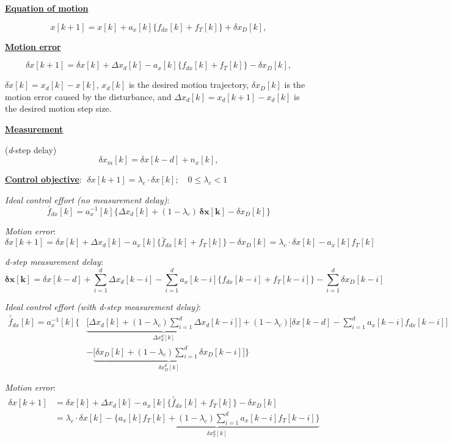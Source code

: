 \documentclass[11pt,a4paper]{ctexart}
\newcommand{\lc}{\lambda_c}
\newcommand{\hd}[1]{\par\medskip\noindent\underline{\textbf{#1}}\par\nobreak\vspace{0.2ex}}
\begin{document}
\hd{Equation of motion}
\[ x[k+1] = x[k] + a_x[k]\{f_{dx}[k] + f_T[k]\} + \delta x_D[k], \]

\hd{Motion error}
\[ \delta x[k+1] = \delta x[k] + \Delta x_d[k] - a_x[k]\{f_{dx}[k] + f_T[k]\} - \delta x_D[k], \]

$\delta x[k] = x_d[k] - x[k]$, $x_d[k]$ is the desired motion trajectory, $\delta x_D[k]$ is the motion error caused by the disturbance, and $\Delta x_d[k] = x_d[k+1] - x_d[k]$ is the desired motion step size.

\hd{Measurement} (\textit{d}-step delay)
\[ \delta x_m[k] = \delta x[k-d] + n_x[k], \]

\noindent\underline{\textbf{Control objective}}: $\;\delta x[k+1] = \lc \cdot \delta x[k];\quad 0 \le \lc < 1$

\medskip
\textit{Ideal control effort (no measurement delay)}:
\[ \bar f_{dx}[k] = a_x^{-1}[k]\{\Delta x_d[k] + (1-\lc)\,\bm{\delta x[k]} - \delta x_D[k]\} \]

\textit{Motion error}:
\[ \delta x[k+1] = \delta x[k] + \Delta x_d[k] - a_x[k]\{\bar f_{dx}[k] + f_T[k]\} - \delta x_D[k] = \lc \cdot \delta x[k] - a_x[k] f_T[k] \]

\textit{d-step measurement delay}:
\[ \bm{\delta x[k]} = \delta x[k-d] + \sum_{i=1}^{d}\Delta x_d[k-i] - \sum_{i=1}^{d} a_x[k-i]\{f_{dx}[k-i] + f_T[k-i]\} - \sum_{i=1}^{d}\delta x_D[k-i] \]

\textit{Ideal control effort (with d-step measurement delay)}:
\[
\begin{aligned}
\bar{\bar f}_{dx}[k] = a_x^{-1}[k]\bigg\{
& \underbrace{\Big[\Delta x_d[k] + (1-\lc)\textstyle\sum_{i=1}^{d}\Delta x_d[k-i]\Big]}_{\Delta x_d^{d}[k]}
+ (1-\lc)\Big[\delta x[k-d] - \textstyle\sum_{i=1}^{d} a_x[k-i] f_{dx}[k-i]\Big] \\[0.5ex]
& - \underbrace{\Big[\delta x_D[k] + (1-\lc)\textstyle\sum_{i=1}^{d}\delta x_D[k-i]\Big]}_{\delta x_D^{d}[k]}
\bigg\}
\end{aligned}
\]

\textit{Motion error}:
\[
\begin{aligned}
\delta x[k+1] &= \delta x[k] + \Delta x_d[k] - a_x[k]\{\bar{\bar f}_{dx}[k] + f_T[k]\} - \delta x_D[k] \\[0.5ex]
&= \lc \cdot \delta x[k] - \underbrace{\Big\{ a_x[k] f_T[k] + (1-\lc)\textstyle\sum_{i=1}^{d} a_x[k-i] f_T[k-i] \Big\}}_{\delta x_T^{d}[k]}
\end{aligned}
\]
\end{document}
